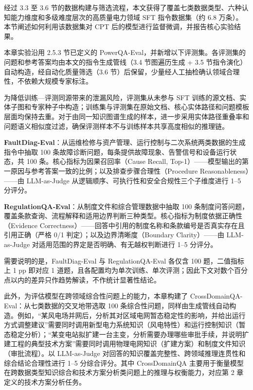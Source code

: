 \documentclass[fontset=fandol,type=master,campus=shenzhen,etitleauto=true]{hithesisbook}
\begin{document}
经过 3.3 至 3.6 节的数据构建与筛选流程，本文获得了覆盖七类数据类型、六种认知能力维度和多级难度层次的高质量电力领域 SFT 指令数据集（约 6.8 万条）。本节阐述如何利用该数据集对 CPT 后的模型进行监督微调，并报告核心实验结果。

本章实验沿用 2.5.3 节已定义的 PowerQA-Eval，并新增以下评测集。各评测集的问题和参考答案均由本文的指令生成管线（3.4 节图遍历生成 + 3.5 节指令演化）自动构造，经自动化质量筛选（3.6 节）后保留，少量经人工抽检确认领域合理性，不依赖大规模专家标注。

为降低训练—评测同源带来的泄漏风险，评测集从未参与 SFT 训练的源文档、实体子图和专家种子中构造；训练集与评测集在原始文档、核心实体路径和问题模板层面均保持去重。对于由同一知识图谱生成的样本，进一步采用实体路径重叠率和问题语义相似度过滤，确保评测样本不与训练样本共享高度相似的推理链。

\textbf{FaultDiag-Eval}：从运维检修与资产管理、运行控制与二次系统两类数据的生成指令中抽取 100 条故障诊断问题，每条提供故障现象、告警信号和设备运行状态，共 100 条。核心指标为因果召回率（Cause Recall, Top-1）------模型输出的第一原因与参考答案一致的比例；以及排查步骤合理性（Procedure Reasonableness）------由 LLM-as-Judge 从逻辑顺序、可执行性和安全合规性三个子维度进行 1--5 分评分。

\textbf{RegulationQA-Eval}：从制度文件和综合管理数据中抽取 100 条制度问答问题，覆盖条款查询、流程解释和适用边界判断三种类型。核心指标为制度依据正确性（Evidence Correctness）------回答中引用的制度名称和条款编号是否真实存在且引用正确（严格 0/1 判定）；以及边界清晰度（Boundary Clarity）------由 LLM-as-Judge 对适用范围的界定是否明确、有无越权判断进行 1--5 分评分。

需要说明的是，FaultDiag-Eval 与 RegulationQA-Eval 各仅含 100 题，二值指标上 1 pp 即对应 1 道题，且各配置均为单次训练、单次评测；因此下文对数个百分点以内的差异只作趋势解读，不作统计显著性结论。

此外，为评估模型在跨领域综合性问题上的能力，本章构建了 CrossDomainQA-Eval：从七类数据的交叉地带选取 100 条综合性问题，同样由生成管线自动构造。例如，``某风电场并网后，分析其对区域电网暂态稳定性的影响，并给出运行方式调整建议''需要同时调用新型电力系统知识（风电特性）和运行控制知识（暂态稳定分析）；``某变电站拟扩建一台主变，分析需要办理哪些审批手续，并说明扩建工程的典型技术方案''需要同时调用物理电网知识（扩建方案）和制度文件知识（审批流程）。以 LLM-as-Judge 对回答的知识覆盖完整性、跨领域推理连贯性和综合结论合理性进行 1--5 分综合评分。其中 CrossDomainQA 主要用于衡量模型在跨数据类型知识综合和技术方案分析类问题上的推理与权衡能力，对应第 2 章定义的技术方案分析任务。
\end{document}
